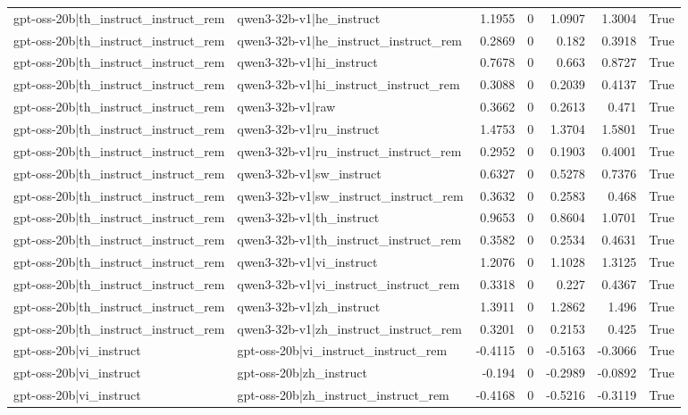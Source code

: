 \begin{table}
\begin{tabular}{l l r r r r l}
gpt-oss-20b|th_instruct_instruct_rem & qwen3-32b-v1|he_instruct & 1.1955 & 0 & 1.0907 & 1.3004 & True \\
gpt-oss-20b|th_instruct_instruct_rem & qwen3-32b-v1|he_instruct_instruct_rem & 0.2869 & 0 & 0.182 & 0.3918 & True \\
gpt-oss-20b|th_instruct_instruct_rem & qwen3-32b-v1|hi_instruct & 0.7678 & 0 & 0.663 & 0.8727 & True \\
gpt-oss-20b|th_instruct_instruct_rem & qwen3-32b-v1|hi_instruct_instruct_rem & 0.3088 & 0 & 0.2039 & 0.4137 & True \\
gpt-oss-20b|th_instruct_instruct_rem & qwen3-32b-v1|raw & 0.3662 & 0 & 0.2613 & 0.471 & True \\
gpt-oss-20b|th_instruct_instruct_rem & qwen3-32b-v1|ru_instruct & 1.4753 & 0 & 1.3704 & 1.5801 & True \\
gpt-oss-20b|th_instruct_instruct_rem & qwen3-32b-v1|ru_instruct_instruct_rem & 0.2952 & 0 & 0.1903 & 0.4001 & True \\
gpt-oss-20b|th_instruct_instruct_rem & qwen3-32b-v1|sw_instruct & 0.6327 & 0 & 0.5278 & 0.7376 & True \\
gpt-oss-20b|th_instruct_instruct_rem & qwen3-32b-v1|sw_instruct_instruct_rem & 0.3632 & 0 & 0.2583 & 0.468 & True \\
gpt-oss-20b|th_instruct_instruct_rem & qwen3-32b-v1|th_instruct & 0.9653 & 0 & 0.8604 & 1.0701 & True \\
gpt-oss-20b|th_instruct_instruct_rem & qwen3-32b-v1|th_instruct_instruct_rem & 0.3582 & 0 & 0.2534 & 0.4631 & True \\
gpt-oss-20b|th_instruct_instruct_rem & qwen3-32b-v1|vi_instruct & 1.2076 & 0 & 1.1028 & 1.3125 & True \\
gpt-oss-20b|th_instruct_instruct_rem & qwen3-32b-v1|vi_instruct_instruct_rem & 0.3318 & 0 & 0.227 & 0.4367 & True \\
gpt-oss-20b|th_instruct_instruct_rem & qwen3-32b-v1|zh_instruct & 1.3911 & 0 & 1.2862 & 1.496 & True \\
gpt-oss-20b|th_instruct_instruct_rem & qwen3-32b-v1|zh_instruct_instruct_rem & 0.3201 & 0 & 0.2153 & 0.425 & True \\
gpt-oss-20b|vi_instruct & gpt-oss-20b|vi_instruct_instruct_rem & -0.4115 & 0 & -0.5163 & -0.3066 & True \\
gpt-oss-20b|vi_instruct & gpt-oss-20b|zh_instruct & -0.194 & 0 & -0.2989 & -0.0892 & True \\
gpt-oss-20b|vi_instruct & gpt-oss-20b|zh_instruct_instruct_rem & -0.4168 & 0 & -0.5216 & -0.3119 & True \\

\end{tabular}
\end{table}
